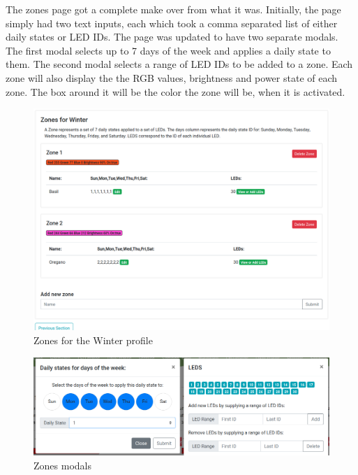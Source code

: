 \documentclass[onecolumn, draftclsnofoot,10pt, compsoc]{IEEEtran}
\begin{document}
		\noindent The zones page got a complete make over from what it was.
		Initially, the page simply had two text inputs, each which took a comma separated list of either daily states or LED IDs.
		The page was updated to have two separate modals. The first modal selects up to 7 days of the week and applies a daily state to them.
		The second modal selects a range of LED IDs to be added to a zone. Each zone will also display the the RGB values, brightness and power state of each 
		zone. The box around it will be the color the zone will be, when it is activated.

		\begin{center}
			\begin{figure}[H]
				\includegraphics[width=\linewidth]{site/zones_winter.png}
				\caption{Zones for the Winter profile}
				\label{fig:siteZonesWinter}
			\end{figure}
		\end{center}
		\begin{center}
			\begin{figure}[H]
				\includegraphics[width=\linewidth]{site/modals.png}
				\caption{Zones modals}
				\label{fig:siteZonesWinterModals}
			\end{figure}
		\end{center}
\end{document}
